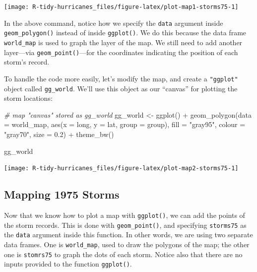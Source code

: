 \documentclass[
]{book}
\newenvironment{Shaded}{\begin{snugshade}}{\end{snugshade}}
\newcommand{\AttributeTok}[1]{\textcolor[rgb]{0.77,0.63,0.00}{#1}}
\newcommand{\CommentTok}[1]{\textcolor[rgb]{0.56,0.35,0.01}{\textit{#1}}}
\newcommand{\FloatTok}[1]{\textcolor[rgb]{0.00,0.00,0.81}{#1}}
\newcommand{\FunctionTok}[1]{\textcolor[rgb]{0.00,0.00,0.00}{#1}}
\newcommand{\NormalTok}[1]{#1}
\newcommand{\OtherTok}[1]{\textcolor[rgb]{0.56,0.35,0.01}{#1}}
\newcommand{\SpecialCharTok}[1]{\textcolor[rgb]{0.00,0.00,0.00}{#1}}
\newcommand{\StringTok}[1]{\textcolor[rgb]{0.31,0.60,0.02}{#1}}
\begin{document}
\begin{center}\texttt{[image: R-tidy-hurricanes\_files/figure-latex/plot-map1-storms75-1]} \end{center}

In the above command, notice how we specify the \texttt{data} argument inside
\texttt{geom\_polygon()} instead of inside \texttt{ggplot()}. We do this because the data
frame \texttt{world\_map} is used to graph the layer of the map. We still need to add
another layer---via \texttt{geom\_point()}---for the coordinates indicating the
position of each storm's record.

To handle the code more easily, let's modify the map, and create a \texttt{"ggplot"}
object called \texttt{gg\_world}. We'll use this object as our ``canvas'' for plotting
the storm locations:

\begin{Shaded}
\begin{Highlighting}[]
\CommentTok{\# map "canvas" stored as gg\_world}
\NormalTok{gg\_world }\OtherTok{\textless{}{-}} \FunctionTok{ggplot}\NormalTok{() }\SpecialCharTok{+} 
  \FunctionTok{geom\_polygon}\NormalTok{(}\AttributeTok{data =}\NormalTok{ world\_map, }
               \FunctionTok{aes}\NormalTok{(}\AttributeTok{x =}\NormalTok{ long, }\AttributeTok{y =}\NormalTok{ lat, }\AttributeTok{group =}\NormalTok{ group), }
               \AttributeTok{fill =} \StringTok{"gray95"}\NormalTok{, }\AttributeTok{colour =} \StringTok{"gray70"}\NormalTok{, }\AttributeTok{size =} \FloatTok{0.2}\NormalTok{) }\SpecialCharTok{+}
  \FunctionTok{theme\_bw}\NormalTok{()}

\NormalTok{gg\_world}
\end{Highlighting}
\end{Shaded}

\begin{center}\texttt{[image: R-tidy-hurricanes\_files/figure-latex/plot-map2-storms75-1]} \end{center}

\hypertarget{mapping-1975-storms}{%
\subsection{Mapping 1975 Storms}\label{mapping-1975-storms}}

Now that we know how to plot a map with \texttt{ggplot()}, we can add the points of
the storm records. This is done with \texttt{geom\_point()}, and specifying \texttt{storms75}
as the \texttt{data} argument inside this function. In other words, we are using two
separate data frames. One is \texttt{world\_map}, used to draw the polygons of the map;
the other one is \texttt{stomrs75} to graph the dots of each storm. Notice also that
there are no inputs provided to the function \texttt{ggplot()}.
\end{document}
